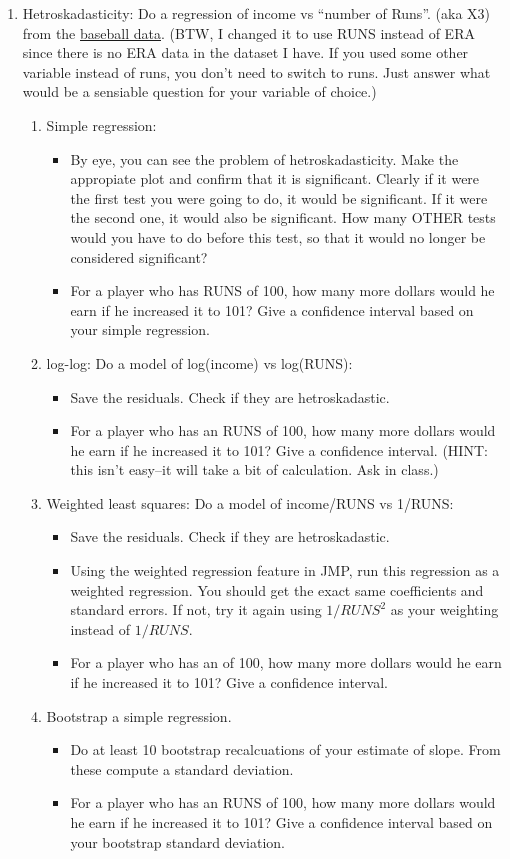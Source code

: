 \documentclass[11pt]{article}
\begin{document}
\begin{enumerate}
\item Hetroskadasticity: Do a regression of income vs ``number of
Runs''. (aka X3) from the \href{http://www4.stat.ncsu.edu/~boos/var.select/baseball.html}{baseball data}.
(BTW, I changed it to use RUNS instead of ERA since there is no ERA
data in the dataset I have.  If you used some other variable instead
of runs, you don't need to switch to runs.  Just answer what would be
a sensiable question for your variable of choice.)
\begin{enumerate}
\item Simple regression:
\begin{itemize}
\item By eye, you can see the problem of hetroskadasticity.  Make the
appropiate plot and confirm that it is significant.  Clearly if it
were the first test you were going to do, it would be significant.  If
it were the second one, it would also be significant.  How many OTHER
tests would you have to do before this test, so that it would no
longer be considered significant?
\item For a player who has RUNS of 100, how many more dollars would
he earn if he increased it to 101?  Give a confidence interval based
on your simple regression.
\end{itemize}
\item log-log:  Do a model of log(income) vs log(RUNS):
\begin{itemize}
\item  Save the residuals.  Check if they are hetroskadastic.
\item For a player who has an RUNS of 100, how many more dollars would
he earn if he increased it to 101?  Give a confidence interval. (HINT:
this isn't easy--it will take a bit of calculation.  Ask in class.)
\end{itemize}
\item Weighted least squares:  Do a model of income/RUNS vs 1/RUNS:
\begin{itemize}
\item  Save the residuals.  Check if they are hetroskadastic.
\item Using the weighted regression feature in JMP, run this
regression as a weighted regression.  You should get the exact same
coefficients and standard errors.  If not, try it again using
$1/RUNS^2$ as your weighting instead of $1/RUNS$.
\item For a player who has an  of 100, how many more dollars would
he earn if he increased it to 101?  Give a confidence interval. 
\end{itemize}
\item Bootstrap a simple regression.
\begin{itemize}
\item Do at least 10 bootstrap recalcuations of your estimate of
slope.  From these compute a standard deviation.
\item For a player who has an RUNS of 100, how many more dollars would
he earn if he increased it to 101?  Give a confidence interval based
on your bootstrap standard deviation.
\end{itemize}
\end{enumerate}
\end{enumerate}
\end{document}
